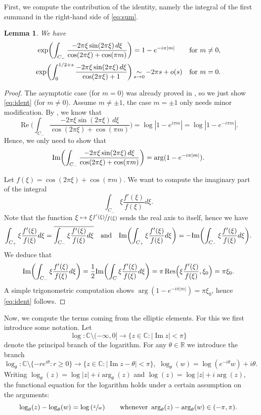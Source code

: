 \documentclass[JEP,XML,SOM,Unicode,NoFloatCountersInSection,published]{cedram}
\newcommand\mto{\mathchoice{\longmapsto}{\mapsto}{\mapsto}{\mapsto}}
\newcommand{\simm}{\mathop{\sim}\displaylimits}
\theoremstyle{plain}
\newtheorem{lem}[thm]{Lemma}
\theoremstyle{definition}
\theoremstyle{remark}
\newcommand{\R}{\mathbb{R}}
\newcommand{\C}{\mathbb{C}}
\renewcommand{\Im}{\textup{Im}}
\DeclareMathOperator{\IM}{Im}
\DeclareMathOperator{\RE}{Re}
\DeclareMathOperator{\Res}{Res}
\numberwithin{equation}{section}
\begin{document}
First, we compute the contribution of the identity, namely the integral of the first summand in the right-hand side of \cref{eq:sum}.
\begin{lem}
\label{lem1}
We have
\begin{align}
\label{eq:ident}
\exp \biggl(\int_{C_-} \frac{-2\pi\xi \sin(2\pi \xi)\,d\xi}{\cos(2\pi \xi) + \cos(\pi m)}\biggr) &= 1-e^{-i\pi|m|} &&\text{for } m \neq 0,\\
\exp\biggl( \int_0^{1/2+s} \frac{-2\pi\xi \sin(2\pi \xi)\,d\xi}{\cos(2\pi \xi) +1}\biggr) &\simm_{s \to 0} -2\pi s + o(s) && \text{for } m=0.\nonumber
\end{align}
\end{lem}
\begin{proof}
The asymptotic case (for $m=0$) was already proved in \cite[Lem.\,3]{fried1986fuchsian}, so we just show \cref{eq:ident} (for $m\neq 0$). Assume $m\neq\pm1$, the case $m=\pm1$ only needs minor modification.
By \cite[Lem.\,2]{fried1986fuchsian}, we know that
\[
\RE\biggl(\int_{C_-} \frac{-2\pi\xi \sin(2\pi \xi)\,d\xi}{\cos(2\pi \xi) + \cos(\pi m)}\biggr) = \log |1-e^{i\pi m}|=\log |1-e^{-i\pi m}|.
\]
Hence, we only need to show that
\[
\Im \biggl(\int_{C_-} \frac{-2\pi\xi \sin(2\pi \xi)\,d\xi}{\cos(2\pi \xi)+ \cos(\pi m)}\biggr) =
\arg(1-e^{-i\pi|m|}).
\]

Let $f(\xi) = \cos(2\pi \xi) + \cos(\pi m)$. We want to compute the imaginary part of the integral
\[
\int_{C_-} \xi \frac{f'(\xi)}{f(\xi)} d\xi.
\]
Note that the function $\xi \mto \xi \sfrac{f'(\xi)}{f(\xi)}$ sends the real axis to itself, hence we have
\[
\int_{C_+} \xi \frac{f'(\xi)}{f(\xi)} d\xi = \overline{\int_{C_-} \xi \frac{f'(\xi)}{f(\xi)} d\xi}\quad\text{and}\quad
\Im \biggl(\int_{C_+} \xi \frac{f'(\xi)}{f(\xi)} d\xi\biggr) = -\Im \biggl(\int_{C_-} \xi \frac{f'(\xi)}{f(\xi)} d\xi\biggr).
\]
We deduce that
\[
\Im \biggl(\int_{C_-} \xi \frac{f'(\xi)}{f(\xi)} d\xi\biggr) = \frac 1 2 \Im \biggl(\int_{C} \xi \frac{f'(\xi)}{f(\xi)} d\xi\biggr) = \pi \Res\Bigl(\xi \frac{f'(\xi)}{f(\xi)}, \xi_0\Bigr)= \pi \xi_0.
\]
A simple trigonometric computation shows
$\arg(1-e^{-i\pi|m|}) = \pi\xi_0$, hence \cref{eq:ident} follows.
\end{proof}

Now, we compute the terms coming from the elliptic elements. For this we first introduce some notation. Let
\[
\log:\C\setminus(-\infty,0]\to\{z\in\C:|\IM z|<\pi\}
\]
denote the principal branch of the logarithm. For any $\theta\in\R$ we introduce the branch
\[
\log\nolimits_\theta:\C\setminus\{-re^{i\theta}:r\geq0\}\to\{z\in\C:|\IM z-\theta|<\pi\}, \,\, \log\nolimits_\theta(w) = \log(e^{-i\theta}w)+i\theta.
\]
Writing $\log\nolimits_\theta(z)=\log|z|+i\arg_\theta(z)$ and $\log(z)=\log|z|+i\arg(z)$, the functional equation for the logarithm holds under a certain assumption on the arguments:
\begin{equation}\label{eq:FunctionalEqLog}
\log\nolimits_\theta(z)-\log\nolimits_\theta(w) = \log\left(\sfrac{z}{w}\right) \qquad \mbox{whenever }\arg_\theta(z)-\arg_\theta(w)\in(-\pi,\pi).
\end{equation}
\end{document}
